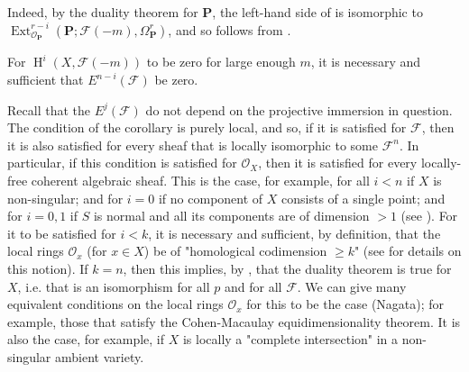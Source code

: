 \begin{cproof}
  Indeed, by the duality theorem for $\mathbf{P}$, the left-hand side of  is isomorphic to $\operatorname{Ext}_{\mathcal{O}_\mathbf{P}}^{r-i}(\mathbf{P};\mathcal{F}(-m),\Omega_\mathbf{P}^r)$, and so  follows from .
\end{cproof}


\begin{corollary}\label{fga1-proposition-6-corollary}
  For $\operatorname{H}^i(X,\mathcal{F}(-m))$ to be zero for large enough $m$, it is necessary and sufficient that $E^{n-i}(\mathcal{F})$ be zero.
\end{corollary}



Recall that the $E^j(\mathcal{F})$ do not depend on the projective immersion in question.
The condition of the corollary is purely local, and so, if it is satisfied for $\mathcal{F}$, then it is also satisfied for every sheaf that is locally isomorphic to some $\mathcal{F}^n$.
In particular, if this condition is satisfied for $\mathcal{O}_X$, then it is satisfied for every locally-free coherent algebraic sheaf.
This is the case, for example, for all $i<n$ if $X$ is non-singular;
and for $i=0$ if no component of $X$ consists of a single point;
and for $i=0,1$ if $S$ is normal and all its components are of dimension $>1$ (see \cite{Ser1955}).
For it to be satisfied for $i<k$, it is necessary and sufficient, by definition, that the local rings $\mathcal{O}_x$ (for $x\in X$) be of "homological codimension $\geqslant k$" (see \cite{Ser1956a} for details on this notion).
If $k=n$, then this implies, by , that the duality theorem is true for $X$, i.e. that  is an isomorphism for all $p$ and for all $\mathcal{F}$.
We can give many equivalent conditions on the local rings $\mathcal{O}_x$ for this to be the case (Nagata);
for example, those that satisfy the Cohen-Macaulay equidimensionality theorem.
It is also the case, for example, if $X$ is locally a "complete intersection" in a non-singular ambient variety.

